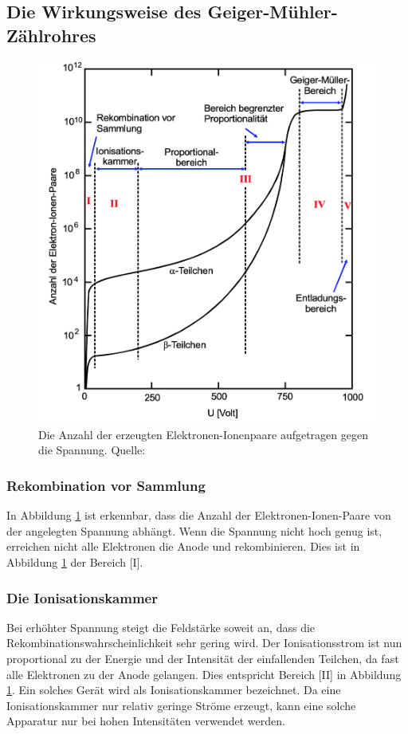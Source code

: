   \subsection{Die Wirkungsweise des Geiger-Mühler-Zählrohres}
    \begin{figure}[H]
      \centering
        \includegraphics[scale=0.4]{content/SpannungAnzahlElektronenGMZ.png}
        \caption{Die Anzahl der erzeugten Elektronen-Ionenpaare aufgetragen gegen die Spannung. Quelle:\cite{AP01}}
          \label{fig:aufbau2}
    \end{figure}
    \noindent
    \subsubsection{Rekombination vor Sammlung}
      In Abbildung \ref{fig:aufbau2} ist erkennbar, dass die Anzahl der Elektronen-Ionen-Paare von der
      angelegten Spannung abhängt. Wenn die Spannung nicht hoch genug ist, erreichen nicht alle
      Elektronen die Anode und rekombinieren. Dies ist in Abbildung \ref{fig:aufbau2} der Bereich [I].
    \subsubsection{Die Ionisationskammer}
      Bei erhöhter Spannung steigt die Feldstärke soweit an, dass die Rekombinationswahrscheinlichkeit
      sehr gering wird. Der Ionisationsstrom ist nun proportional zu der Energie und der Intensität
      der einfallenden Teilchen, da fast alle Elektronen zu der Anode gelangen. Dies entspricht
      Bereich [II] in Abbildung \ref{fig:aufbau2}. Ein solches Gerät wird als Ionisationskammer
      bezeichnet. Da eine Ionisationskammer nur relativ geringe Ströme erzeugt, kann eine solche
      Apparatur nur bei hohen Intensitäten verwendet werden.
